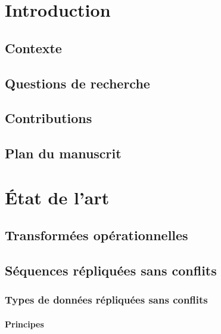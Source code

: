 \documentclass[12pt]{thesul}
\begin{document}
\DontWriteThisInToc
\listoffigures

\mainmatter
\NumberThisInToc
\chapter*{Introduction}
\minitoc
\section{Contexte}
\section{Questions de recherche}
\section{Contributions}
\section{Plan du manuscrit}
% 

% 

\NumberThisInToc
\chapter{État de l'art}
\minitoc
\section{Transformées opérationnelles}
\section{Séquences répliquées sans conflits}
\subsection{Types de données répliquées sans conflits}
\subsubsection{Principes}
\end{document}
